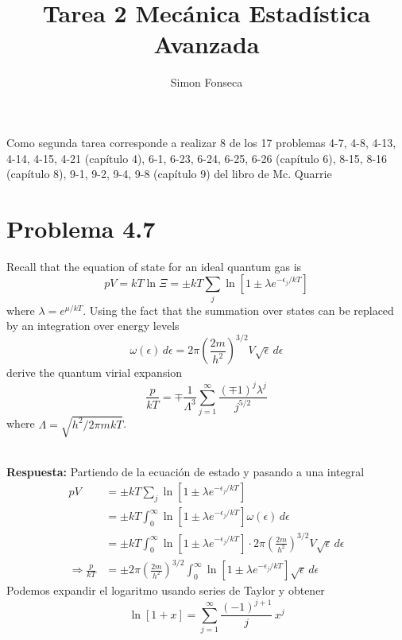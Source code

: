 \documentclass[]{article}
\title{Tarea 2 Mecánica Estadística Avanzada}
\author{Simon Fonseca}
\numberwithin{equation}{section}
\newcommand{\0}{\textcolor{gray}{0}}
\newcommand{\resp}{
	\\
	
	\textbf{Respuesta:} }
\begin{document}
\maketitle

Como segunda tarea corresponde a realizar 8 de los 17 problemas 4-7, 4-8, 4-13, 4-14, 4-15, 4-21 (capítulo 4), 6-1, 6-23, 6-24, 6-25, 6-26 (capítulo 6), 8-15, 8-16 (capítulo 8), 9-1, 9-2, 9-4, 9-8 (capítulo 9) del libro de Mc. Quarrie

\section{Problema 4.7}
Recall that the equation of state for an ideal quantum gas is
\begin{equation}
	pV = kT\ln\Xi = \pm kT \sum_{j}\ln\left[1 \pm \lambda e^{-\epsilon_j/kT}\right]
\end{equation}
where $\lambda = e^{\mu/kT}$. Using the fact that the summation over states can be replaced by an integration over energy levels
\begin{equation}
	\omega(\epsilon) \, d\epsilon = 2\pi \left(\frac{2m}{h^2}\right)^{3/2} V \sqrt{\epsilon} \, d\epsilon
\end{equation}
derive the quantum virial expansion
\begin{equation}
	\frac{p}{kT} = \mp \frac{1}{\Lambda^3} \sum_{j=1}^{\infty} \frac{(\mp 1)^j \lambda^j}{j^{5/2}}
\end{equation}
where $\Lambda = \sqrt{h^2 / 2\pi m k T}$.
\resp Partiendo de la ecuación de estado y pasando a una integral
\begin{align*}
	pV &= \pm kT \sum_{j}\ln\left[1 \pm \lambda e^{-\epsilon_j/kT}\right]\\
	&= \pm kT \int_{0}^{\infty} \ln\left[1 \pm \lambda e^{-\epsilon_j/kT}\right] \omega(\epsilon) \, d\epsilon\\
	&= \pm kT \int_{0}^{\infty} \ln\left[1 \pm \lambda e^{-\epsilon_j/kT}\right] \cdot 2\pi \left(\frac{2m}{h^2}\right)^{3/2} V \sqrt{\epsilon} \, d\epsilon\\
	\Rightarrow \frac{p}{kT} &= \pm 2\pi \left(\frac{2m}{h^2}\right)^{3/2} \int_{0}^{\infty} \ln\left[1 \pm \lambda e^{-\epsilon_j/kT}\right] \sqrt{\epsilon} \, d\epsilon
\end{align*}
Podemos expandir el logaritmo usando series de Taylor y obtener
\begin{equation*}
	\ln\left[1 + x\right] = \sum_{j=1}^{\infty} \frac{(-1)^{j+1}}{j} \, x^j
\end{equation*}
\end{document}
